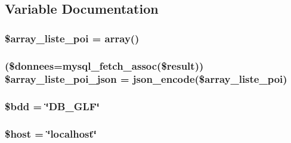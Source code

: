\subsection{Variable Documentation}
\hypertarget{nearest_poi_8php_a3a846417945073aeceae8128dc5beb21}{
\subsubsection[{\$array\-\_\-liste\-\_\-poi}]{\setlength{\rightskip}{0pt plus 5cm}\$array\-\_\-liste\-\_\-poi = array()}}\label{nearest_poi_8php_a3a846417945073aeceae8128dc5beb21}
\hypertarget{nearest_poi_8php_a49df244be28fda7e00096232b5cd340a}{
\subsubsection[{\$array\-\_\-liste\-\_\-poi\-\_\-json}]{ (\$donnees=mysql\-\_\-fetch\-\_\-assoc(\$result)) \$array\-\_\-liste\-\_\-poi\-\_\-json = json\-\_\-encode(\$array\-\_\-liste\-\_\-poi)}}\label{nearest_poi_8php_a49df244be28fda7e00096232b5cd340a}
\hypertarget{nearest_poi_8php_a94f91e878bce0991e2cd595c5dd79b3f}{
\subsubsection[{\$bdd}]{\setlength{\rightskip}{0pt plus 5cm}\$bdd = \char`\"{}D\-B\-\_\-\-G\-L\-F\char`\"{}}}\label{nearest_poi_8php_a94f91e878bce0991e2cd595c5dd79b3f}
\hypertarget{nearest_poi_8php_a711797613cb863ca0756df789c396bf2}{
\subsubsection[{\$host}]{\setlength{\rightskip}{0pt plus 5cm}\$host = \char`\"{}localhost\char`\"{}}}\label{nearest_poi_8php_a711797613cb863ca0756df789c396bf2}
